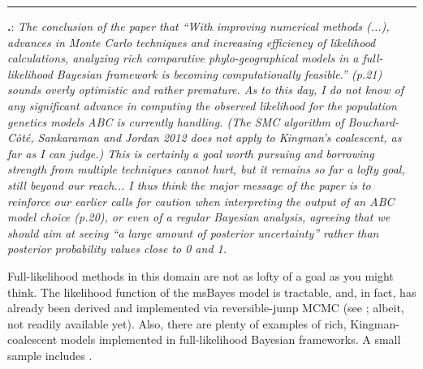 \documentclass[12pt]{article}
\newcounter{commentCounter}
\newcommand{\revcomment}[1]{{\addtocounter{commentCounter}{1}}
    \medskip \hrule \noindent
\textbf{\arabic{section}.\arabic{commentCounter}}: {\sl #1}\par\xspace}
\newcommand{\response}[1]{{\addtolength{\leftskip}{0.25in} #1\par}\xspace}
\begin{document}
\revcomment{
    The conclusion of the paper that ``With improving numerical methods (...),
    advances in Monte Carlo techniques and increasing efficiency of likelihood
    calculations, analyzing rich comparative phylo-geographical models in a
    full-likelihood Bayesian framework is becoming computationally feasible.''
    (p.21) sounds overly optimistic and rather premature. As to this day, I do
    not know of any significant advance in computing the observed likelihood
    for the population genetics models ABC is currently handling. (The SMC
    algorithm of Bouchard-Côté, Sankaraman and Jordan 2012 does not apply to
    Kingman's coalescent, as far as I can judge.) This is certainly a goal
    worth pursuing and borrowing strength from multiple techniques cannot hurt,
    but it remains so far a lofty goal, still beyond our reach... I thus think
    the major message of the paper is to reinforce our earlier calls for
    caution when interpreting the output of an ABC model choice (p.20), or even
    of a regular Bayesian analysis, agreeing that we should aim at seeing ``a
    large amount of posterior uncertainty'' rather than posterior probability
    values close to 0 and 1.
}
\response{
    Full-likelihood methods in this domain are not as lofty of a goal as you
    might think. The likelihood function of the msBayes model is tractable,
    and, in fact, has already been derived and implemented via reversible-jump
    MCMC (see \cite{JeetDiss}; albeit, not readily available yet).
    Also, there are plenty of examples of rich, Kingman-coalescent models
    implemented in full-likelihood Bayesian frameworks.
    A small sample includes \cite{Drummond2005,Drummond2008,Drummond2002,Kuhner1995,Hey2007,Hey2010,Bryant2012,Shapiro2011,Vaughan2014,Heled2010,Lemey2009,Lemey2010,Pybus2012,Baele2012,Minin2008beast,Bloomquist2010}.
}



\end{document}
